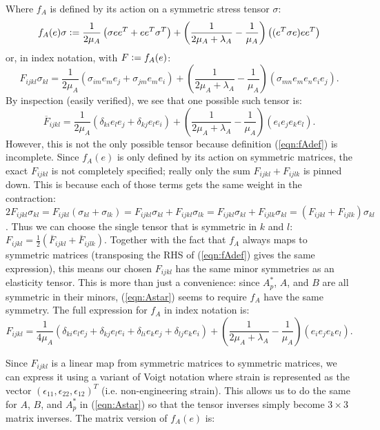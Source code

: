\documentclass[10pt]{article}
\newcommand{\defeq}{\vcentcolon=}
\begin{document}
Where $f_A$ is defined by its action on a symmetric stress tensor $\sigma$:
\begin{align}
f_A(e) \sigma \defeq \frac{1}{2\mu_A} \left(\sigma e e^T + e e^T \sigma^T \right)
    + \left(\frac{1}{2 \mu_A  + \lambda_A} - \frac{1}{\mu_A}\right)\left(
    (e^T \sigma e) e e^T \right)
\label{eqn:fAdef}
\end{align}
or, in index notation, with $F \defeq f_A(e)$:
$$
F_{ijkl} \sigma_{kl} = \frac{1}{2\mu_A} \left(\sigma_{im} e_m e_j + \sigma_{jm} e_m e_i \right)
    + \left(\frac{1}{2 \mu_A  + \lambda_A} - \frac{1}{\mu_A}\right)\left(
    \sigma_{mn} e_m e_n e_i e_j \right).
$$
By inspection (easily verified), we see that one possible such tensor is:
$$
\overline{F}_{ijkl} = \frac{1}{2 \mu_A} (\delta_{ki} e_l e_j + \delta_{kj} e_l e_i) +
\left(\frac{1}{2 \mu_A + \lambda_A} - \frac{1}{\mu_A}\right)(e_i e_j e_k e_l).
$$
However, this is not the only possible tensor because definition (\ref{eqn:fAdef}) is
incomplete. Since $f_A(e)$ is only defined by its
action on symmetric matrices, the exact $F_{ijkl}$ is not completely specified;
really only the sum $F_{ijkl} + F_{ijlk}$ is pinned down. This is because each
of those terms gets the same weight in the contraction: $2 F_{ijkl} \sigma_{kl} =
F_{ijkl} (\sigma_{kl} + \sigma_{lk}) =
F_{ijkl} \sigma_{kl} + F_{ijkl}\sigma_{lk} =
F_{ijkl} \sigma_{kl} + F_{ijlk}\sigma_{kl} =  
(F_{ijkl} + F_{ijlk})\sigma_{kl}$.
Thus we can choose the single tensor that is symmetric in $k$ and $l$: $F_{ijkl}
= \frac{1}{2}(\overline{F}_{ijkl} + \overline{F}_{ijlk})$. Together with the
fact that $f_A$ always maps to symmetric matrices (transposing the
RHS of (\ref{eqn:fAdef}) gives the same expression), this means our chosen
$F_{ijkl}$ has the same minor symmetries as an elasticity tensor. This is more
than just a convenience: since $A^*_p$, $A$, and $B$ are all symmetric in their
minors, (\ref{eqn:Astar}) seems to require $f_A$ have the same symmetry. The
full expression for $f_A$ in index notation is:
$$
F_{ijkl} = 
\frac{1}{4 \mu_A} (\delta_{ki} e_l e_j + \delta_{kj} e_l e_i + \delta_{li} e_k e_j + \delta_{lj} e_k e_i) +
\left(\frac{1}{2 \mu_A + \lambda_A} - \frac{1}{\mu_A}\right)(e_i e_j e_k e_l).
$$

Since $F_{ijkl}$ is a linear map from symmetric matrices to symmetric matrices,
we can express it using a variant of Voigt notation where strain is represented
as the vector $(\epsilon_{11}, \epsilon_{22}, \epsilon_{12})^T$ (i.e.
non-engineering strain). This allows us to do the
same for $A$, $B$, and $A^*_p$ in (\ref{eqn:Astar}) so that the tensor inverses
simply become $3\times3$ matrix inverses. The matrix version of $f_A(e)$ is:
\end{document}

